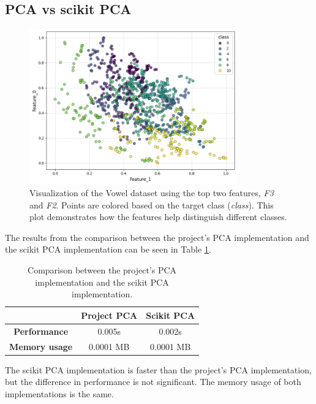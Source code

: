 \subsection{PCA vs scikit PCA}
\label{subsec:pca-vs-scikit-pca}





\begin{figure}[ht!]
    \centering
    \includegraphics[width=0.8\textwidth]{figures/vowel_dataset.png}
    \caption{Visualization of the Vowel dataset using the top two features, \textit{F3} and \textit{F2}. Points are colored based on the target class (\textit{class}). This plot demonstrates how the features help distinguish different classes.}
    \label{fig:vowel_top_features}
\end{figure}

The results from the comparison between the project's PCA implementation and the scikit PCA implementation can be seen in Table \ref{tab:pca-vs-scikit-pca}.

\begin{table}[h]
    \centering
    \begin{tabular}{|c|c|c|}
        \hline
        & \textbf{Project PCA} & \textbf{Scikit PCA} \\ \hline
        \textbf{Performance} & 0.005s & 0.002s \\ \hline
        \textbf{Memory usage} & 0.0001 MB & 0.0001 MB \\ \hline
    \end{tabular}
    \caption{Comparison between the project's PCA implementation and the scikit PCA implementation.}
    \label{tab:pca-vs-scikit-pca}
\end{table}

The scikit PCA implementation is faster than the project's PCA implementation, but the difference in performance is not significant. The memory usage of both implementations is the same.